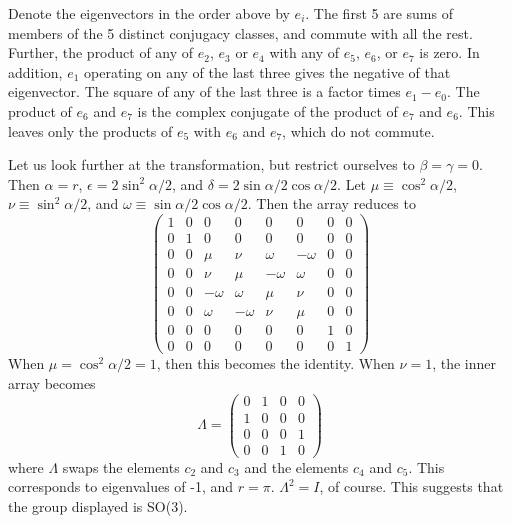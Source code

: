 \documentclass[12pt]{article}
\begin{document}
Denote the eigenvectors in the order above by $e_i$.  The first 5 are
sums of members of the 5 distinct conjugacy classes, and commute with
all the rest.
Further, the product of any of $e_2$, $e_3$ or $e_4$ with any of $e_5$,
$e_6$, or $e_7$ is zero.  In addition, $e_1$ operating on any of the
last three gives the negative of that eigenvector.  The square of any of the
last three is a factor times $e_1 - e_0$.  The product of $e_6$ and $e_7$ is
the complex conjugate of the product of $e_7$ and $e_6$.  This
leaves only the products of $e_5$ with $e_6$ and $e_7$, which do not
commute.  


 Let us look further at the transformation, but restrict ourselves to
$\beta = \gamma = 0$.  Then $\alpha = r$, $\epsilon = 2\sin^2{\alpha/2}$,
and $\delta = 2 \sin{\alpha/2} \cos{\alpha/2}$.  Let $\mu \equiv
\cos^2{\alpha/2}$, $\nu \equiv \sin^2{\alpha/2}$, and $\omega \equiv
\sin{\alpha/2} \cos{\alpha/2}$.  Then the array reduces to
$$
\left( \begin{array}{cccccccc}
1 & 0 & 0 & 0 & 0 & 0 & 0 & 0 \\
0 & 1 & 0 & 0 & 0 & 0 & 0 & 0 \\
0 & 0 & \mu & \nu & \omega & -\omega & 0 & 0 \\
0 & 0 & \nu & \mu & -\omega & \omega & 0 & 0 \\
0 & 0 & -\omega & \omega & \mu & \nu & 0 & 0 \\
0 & 0 & \omega & -\omega & \nu & \mu & 0 & 0 \\
0 & 0 & 0 & 0 & 0 & 0 & 1 & 0 \\
0 & 0 & 0 & 0 & 0 & 0 & 0 & 1
\end{array} \right)
$$
When $\mu = \cos^2{\alpha/2} = 1$, then this becomes the identity.
When $\nu = 1$, the inner array becomes
$$
\Lambda = \left( \begin{array}{cccc}
0 & 1 & 0 & 0 \\
1 & 0 & 0 & 0 \\
0 & 0 & 0 & 1 \\
0 & 0 & 1 & 0
\end{array} \right)
$$
where $\Lambda$ swaps the elements $c_2$ and $c_3$ and the elements
$c_4$ and $c_5$.  This corresponds to eigenvalues of -1, and $r = \pi$.
$\Lambda^2 = I$, of course.  This suggests that
the group displayed is SO(3).
\end{document}
